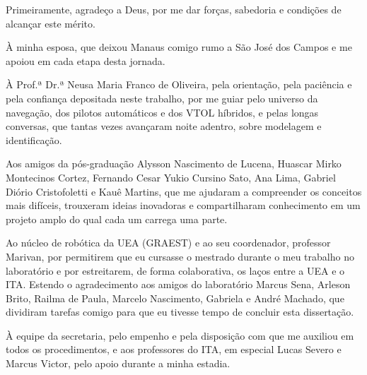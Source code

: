 Primeiramente, agradeço a Deus, por me dar forças, sabedoria e condições de alcançar este mérito.

À minha esposa, que deixou Manaus comigo rumo a São José dos Campos e me apoiou em cada etapa desta jornada.

À Prof.ª Dr.ª Neusa Maria Franco de Oliveira, pela orientação, pela paciência e pela confiança depositada neste trabalho, por me guiar pelo universo da navegação, dos pilotos automáticos e dos VTOL híbridos, e pelas longas conversas, que tantas vezes avançaram noite adentro, sobre modelagem e identificação.

Aos amigos da pós-graduação Alysson Nascimento de Lucena, Huascar Mirko Montecinos Cortez, Fernando Cesar Yukio Cursino Sato, Ana Lima, Gabriel Diório Cristofoletti e Kauê Martins, que me ajudaram a compreender os conceitos mais difíceis, trouxeram ideias inovadoras e compartilharam conhecimento em um projeto amplo do qual cada um carrega uma parte.

Ao núcleo de robótica da UEA (GRAEST) e ao seu coordenador, professor Marivan, por permitirem que eu cursasse o mestrado durante o meu trabalho no laboratório e por estreitarem, de forma colaborativa, os laços entre a UEA e o ITA. Estendo o agradecimento aos amigos do laboratório Marcus Sena, Arleson Brito, Railma de Paula, Marcelo Nascimento, Gabriela e André Machado, que dividiram tarefas comigo para que eu tivesse tempo de concluir esta dissertação.

À equipe da secretaria, pelo empenho e pela disposição com que me auxiliou em todos os procedimentos, e aos professores do ITA, em especial Lucas Severo e Marcus Victor, pelo apoio durante a minha estadia.
